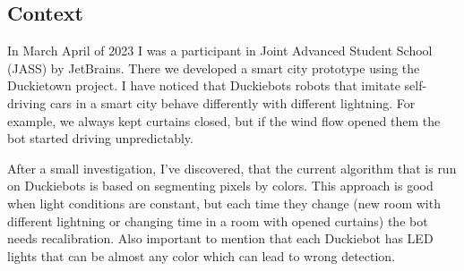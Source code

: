 \subsection{Context}
In March \- April of 2023 I was a participant in Joint Advanced Student School (JASS) by JetBrains. 
There we developed a smart city prototype using the Duckietown project. I have noticed that Duckiebots \- robots that imitate self-driving cars in a smart city behave 
differently with different lightning. For example, we always kept curtains closed, but if the wind flow opened them the bot started driving unpredictably.

After a small investigation, I've discovered, that the current algorithm that is run on Duckiebots is based on segmenting pixels by colors. This approach is good when 
light conditions are constant, but each time they change (new room with different lightning or changing time in a room with opened curtains) 
the bot needs recalibration. Also important to mention that each Duckiebot has LED lights that can be almost any color which can lead to wrong detection.

